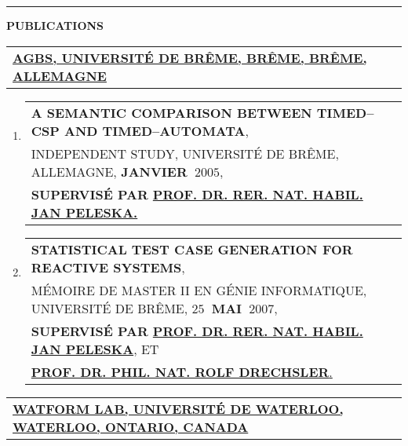 \documentclass[9pt,a4paper]{article} %
\makeatletter
\newcommand{\headerrow}[2]
{\begin{tabular*}{\linewidth}{l@{\extracolsep{\fill}}r}
	#1 &
	#2 \\
\end{tabular*}}
\newcommand{\headerrowONE}[1]{\headerrow{#1}{}}
\makeatother
\begin{document}
\vspace{1em}

\hrule
\begin{center}
{\large \textbf{PUBLICATIONS}}
\end{center}

\vspace{0.5em}

\headerrowONE{\href{http://www.informatik.uni-bremen.de/agbs}{
	\textbf{AGBS, UNIVERSITÉ DE BRÊME, BRÊME, BRÊME, ALLEMAGNE}}}

\vspace{0.3em}

\begin{enumerate}
\item \headerrowONE{\textbf{A SEMANTIC COMPARISON BETWEEN TIMED--CSP AND TIMED--AUTOMATA},\\
	INDEPENDENT STUDY, UNIVERSITÉ DE BRÊME, ALLEMAGNE, \textbf{JANVIER~$2005$},\\
	\textbf{SUPERVISÉ PAR \href{http://www.informatik.uni-bremen.de/agbs/jp}
		{PROF. DR. RER. NAT. HABIL. JAN PELESKA.}}}
 
\item \headerrowONE{\textbf{STATISTICAL TEST CASE GENERATION FOR REACTIVE SYSTEMS},\\
	MÉMOIRE DE MASTER II EN GÉNIE INFORMATIQUE, UNIVERSITÉ DE BRÊME, \textbf{$25$~MAI~$2007$},\\
	\textbf{SUPERVISÉ PAR \href{http://www.informatik.uni-bremen.de/agbs/jp}{
	PROF. DR. RER. NAT. HABIL. JAN PELESKA}}, ET\\
	\href{http://www.rolfdrechsler.de}{\textbf{PROF. DR. PHIL. NAT. ROLF DRECHSLER}.}}
\end{enumerate}

\vspace{1em}

\headerrowONE{\href{http://watform.uwaterloo.ca}{
	\textbf{WATFORM LAB, UNIVERSITÉ DE WATERLOO, WATERLOO, ONTARIO, CANADA}}}

\vspace{0.3em}
\end{document}
